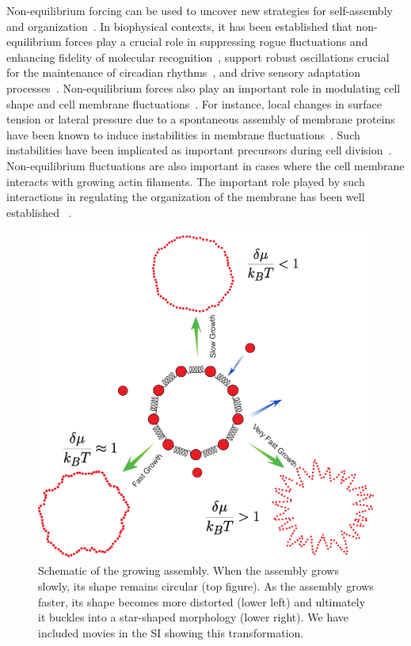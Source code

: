 \documentclass[amsmath,preprintnumbers,10pt,nofootinbib,prl,twocolumn]{revtex4-1}
\begin{document}
 Non-equilibrium forcing can be used to uncover new strategies for self-assembly and organization~\cite{Battle604,Lan2012,Mehta2012,Whitelam2014}. In biophysical contexts, it has been established that non-equilibrium forces play a crucial role in suppressing rogue fluctuations and enhancing fidelity of molecular recognition~\cite{Hopfield1974,Mehta2012,Murugan2012,Murugan2016,Vaikunt2017}, support robust oscillations crucial for the maintenance of circadian rhythms~\cite{Barato2017}, and drive sensory adaptation processes~\cite{Lan2012,Mehta2012}. Non-equilibrium forces also play an important role in modulating cell shape and cell membrane fluctuations~\cite{McMahon2005, Turlier2016}. For instance, local changes in surface tension or lateral pressure due to a spontaneous assembly of membrane proteins have been known to induce instabilities in membrane fluctuations~\cite{Stachowiak2012, Chen2016,Rangamani2014,Leibler1986}. Such instabilities have been implicated as important precursors during cell division~\cite{McMahon2005}. Non-equilibrium fluctuations are also important in cases where the cell membrane interacts with growing actin filaments. The important role played by such interactions in regulating the organization of the membrane has been well established ~\cite{Gowrishankar2012,Weichsel2016}.
\begin{figure}[tbb]
\centering
\includegraphics[scale=0.35]{Fig1.pdf}
\caption{Schematic of the growing assembly. When the assembly grows slowly, its shape remains circular (top figure). As the assembly grows faster, its shape becomes more distorted (lower left) and ultimately it buckles into a star-shaped morphology (lower right). We have included movies in the SI showing this transformation.} \label{fig:phases}
\end{figure}
\end{document}
